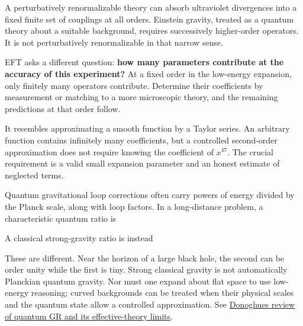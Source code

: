 \documentclass[
  11pt,
  letterpaper,
  oneside,
  openany]{scrbook}
\begin{document}
A perturbatively renormalizable theory can absorb ultraviolet
divergences into a fixed finite set of couplings at all orders. Einstein
gravity, treated as a quantum theory about a suitable background,
requires successively higher-order operators. It is not perturbatively
renormalizable in that narrow sense.

EFT asks a different question: \textbf{how many parameters contribute at
the accuracy of this experiment?} At a fixed order in the low-energy
expansion, only finitely many operators contribute. Determine their
coefficients by measurement or matching to a more microscopic theory,
and the remaining predictions at that order follow.

It resembles approximating a smooth function by a Taylor series. An
arbitrary function contains infinitely many coefficients, but a
controlled second-order approximation does not require knowing the
coefficient of \(x^{47}\). The crucial requirement is a valid small
expansion parameter and an honest estimate of neglected terms.

Quantum gravitational loop corrections often carry powers of energy
divided by the Planck scale, along with loop factors. In a long-distance
problem, a characteristic quantum ratio is

\begin{center}
\begingroup
{}
\ifdim\wd\grmathbox>\linewidth
\resizebox{\linewidth}{!}{\usebox{\grmathbox}}
\else\usebox{\grmathbox}\fi
\endgroup
\end{center}

A classical strong-gravity ratio is instead

\begin{center}
\begingroup
{}
\ifdim\wd\grmathbox>\linewidth
\resizebox{\linewidth}{!}{\usebox{\grmathbox}}
\else\usebox{\grmathbox}\fi
\endgroup
\end{center}

These are different. Near the horizon of a large black hole, the second
can be order unity while the first is tiny. Strong classical gravity is
not automatically Planckian quantum gravity. Nor must one expand about
flat space to use low-energy reasoning; curved backgrounds can be
treated when their physical scales and the quantum state allow a
controlled approximation. See
\href{https://arxiv.org/abs/2211.09902}{Donoghue\textquotesingle s
review of quantum GR and its effective-theory limits}.
\end{document}
